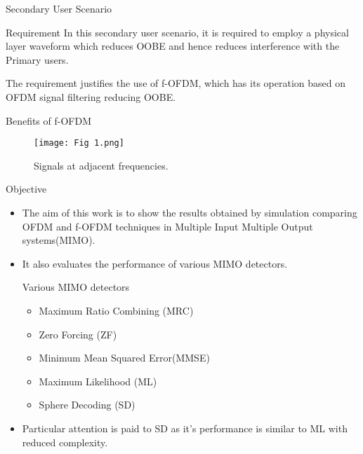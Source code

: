 \documentclass{beamer}
\begin{document}
\begin{frame}{Secondary User Scenario}
    \begin{block}{Requirement}
     In this secondary user scenario, it is required to employ a physical layer waveform which reduces OOBE and hence reduces interference with the Primary users.
    \end{block}
    The requirement justifies the use of f-OFDM, which has its operation based on OFDM signal filtering reducing OOBE.
\end{frame}
\begin{frame}{Benefits of f-OFDM}
\begin{figure}
    \centering
    \texttt{[image: Fig 1.png]}
    \caption{Signals at adjacent frequencies.}
    \label{fig: 1}
\end{figure}
\end{frame}
\begin{frame}{Objective}
    \begin{itemize}
        \item The aim of this work is to show the results obtained by simulation comparing OFDM and f-OFDM techniques in Multiple Input Multiple Output systems(MIMO).
        \item It also evaluates the performance of various MIMO detectors.
        \begin{block}{Various MIMO detectors}
        \begin{itemize}
            \item Maximum Ratio Combining (MRC)
            \item Zero Forcing (ZF)
            \item Minimum Mean Squared Error(MMSE)
            \item Maximum Likelihood (ML)
            \item Sphere Decoding (SD)
        \end{itemize}
        \end{block}
        \item Particular attention is paid to SD as it's performance is similar to ML with reduced complexity.
    \end{itemize}
\end{frame}
\end{document}
